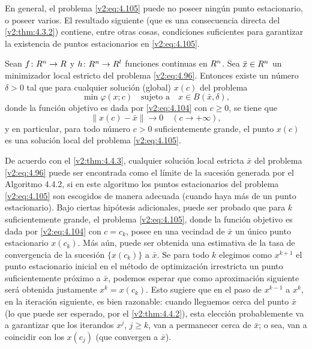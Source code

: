 En general, el problema \eqref{v2:eq:4.105} puede no poseer ningún punto estacionario, o poseer varios. El resultado siguiente (que es una consecuencia directa del \cref{v2:thm:4.3.2}) contiene, entre otras cosas, condiciones suficientes para garantizar la existencia de puntos estacionarios en \eqref{v2:eq:4.105}.

\begin{theorem}\label{v2:thm:4.4.3}
    Sean $f \colon R^n \to R$ y $h \colon R^n \to R^l$ funciones continuas en $R^n$. Sea $\bar{x} \in R^n$ un minimizador local estricto del problema \eqref{v2:eq:4.96}.
    Entonces existe un número $\delta > 0$ tal que para cualquier solución (global) $x(c)$ del problema
    \[
        \min \varphi(x; c) \quad \text{sujeto a} \quad x \in B(\bar{x}, \delta),
    \]
    donde la función objetivo es dada por \eqref{v2:eq:4.104} con $c \ge 0$, se tiene que
    \begin{equation}
        \|x(c) - \bar{x}\| \to 0 \quad (c \to +\infty),
        \label{v2:eq:4.109}
    \end{equation}
    y en particular, para todo número $c > 0$ suficientemente grande, el punto $x(c)$ es una solución local del problema \eqref{v2:eq:4.105}.
\end{theorem}

De acuerdo con el \cref{v2:thm:4.4.3}, cualquier solución local estricta $\bar{x}$ del problema \eqref{v2:eq:4.96} puede ser encontrada como el límite de la sucesión generada por el Algoritmo 4.4.2, si en este algoritmo los puntos estacionarios del problema \eqref{v2:eq:4.105} son escogidos de manera adecuada (cuando haya más de un punto estacionario). Bajo ciertas hipótesis adicionales, puede ser probado que para $k$ suficientemente grande, el problema \eqref{v2:eq:4.105}, donde la función objetivo es dada por \eqref{v2:eq:4.104} con $c = c_k$, posee en una vecindad de $\bar{x}$ un único punto estacionario $x(c_k)$. Más aún, puede ser obtenida una estimativa de la tasa de convergencia de la sucesión $\{x(c_k)\}$ a $\bar{x}$. Se para todo $k$ elegimos como $x^{k+1}$ el punto estacionario inicial en el método de optimización irrestricta un punto suficientemente próximo a $\bar{x}$, podemos esperar que como aproximación siguiente será obtenida justamente $x^k = x(c_k)$. Esto sugiere que en el paso de $x^{k-1}$ a $x^k$, en la iteración siguiente, es bien razonable: cuando lleguemos cerca del punto $\bar{x}$ (lo que puede ser esperado, por el \cref{v2:thm:4.4.2}), esta elección probablemente va a garantizar que los iterandos $x^j$, $j \ge k$, van a permanecer cerca de $\bar{x}$; o sea, van a coincidir con los $x(c_j)$ (que convergen a $\bar{x}$).

